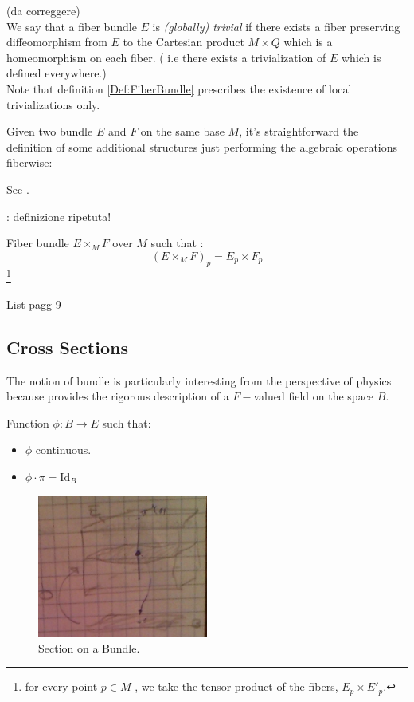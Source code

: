 \documentclass[a4paper,12pt]{scrartcl}    %
\begin{document}
\begin{notationfix}
	\danger(da correggere)\\
	We say that a fiber bundle $E$ is \emph{(globally) trivial} if there exists a fiber preserving diffeomorphism from $E$ to the Cartesian product $M×Q$ which is a homeomorphism on each fiber. (  i.e there exists a trivialization of $E$ which is defined everywhere.)
	\\
	Note that definition \ref{Def:FiberBundle} prescribes the existence of local trivializations only.
\end{notationfix}



Given two bundle $E$ and $F$ on the same base $M$, it's straightforward the definition of some additional structures just performing the algebraic operations fiberwise:
\begin{definition}
	See  \cite{advances}.
\end{definition}
\danger : definizione ripetuta!
\begin{definition}
	Fiber bundle $E \times_M F$ over $M$ such that :
	\begin{displaymath}
		(E \times_M F )_p = E_p \times F_p
	\end{displaymath}
	\footnote{for every point $p\in M$ , we take the tensor product of the fibers, $E_p \times E'_p$.}
\end{definition}

\begin{Warning}
	List pagg 9 \cite{primer}
\end{Warning}


\subsection{Cross Sections}
The notion of bundle is particularly interesting from the perspective of physics because provides the rigorous description of a $F-$valued field on the space $B$.

\begin{definition}
Function $\phi : B \rightarrow E$ such that:
\begin{itemize}
\item $\phi$ continuous.
\item $\phi \cdot \pi = \textrm{Id}_{B}$ 
\end{itemize}
\end{definition}

\begin{figure}[h!]
  \caption{Section on a Bundle.}
  	\includegraphics[width=0.5\textwidth]{TempPictures/CrossSection.jpg}
  \centering
\end{figure}
\end{document}

